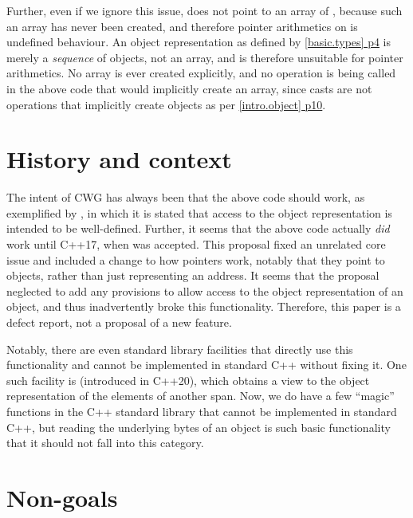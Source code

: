 Further, even if we ignore this issue,  does not point to an array of , because such an array has never been created, and therefore pointer arithmetics on  is undefined behaviour. An object representation as defined by \href{https://timsong-cpp.github.io/cppwp/n4861/basic.types#4}{[basic.types] p4} is merely a \emph{sequence} of  objects, not an array, and is therefore unsuitable for pointer arithmetics. No array is ever created explicitly, and no operation is being called in the above code that would implicitly create an array, since casts are not operations that implicitly create objects as per \href{https://timsong-cpp.github.io/cppwp/n4861/intro.object#10}{[intro.object] p10}.

\section{History and context}

The intent of CWG has always been that the above code should work, as exemplified by \cite{CWG1314}, in which it is stated that access to the object representation is intended to be well-defined. Further, it seems that the above code actually \emph{did} work until C++17, when \cite{P0137R1} was accepted. This proposal fixed an unrelated core issue and included a change to how pointers work, notably that they point to objects, rather than just representing an address. It seems that the proposal neglected to add any provisions to allow access to the object representation of an object, and thus inadvertently broke this functionality. Therefore, this paper is a defect report, not a proposal of a new feature.

Notably, there are even standard library facilities that directly use this functionality and cannot be implemented in standard C++ without fixing it. One such facility is  (introduced in C++20), which obtains a  view to the object representation of the elements of another span. Now, we do have a few ``magic'' functions in the C++ standard library that cannot be implemented in standard C++, but reading the underlying bytes of an object is such basic functionality that it should not fall into this category.

\section{Non-goals}

